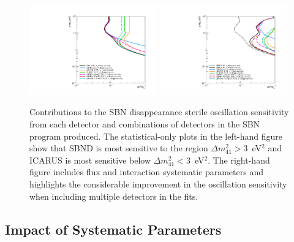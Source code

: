 \begin{figure}[h!]
    \centering
    \includegraphics[width = 0.49\textwidth]{figures-chap6/exclusion_contours/nue_disapp_detector_combinations_stat-only.pdf}
    \includegraphics[width = 0.49\textwidth]{figures-chap6/exclusion_contours/nue_disapp_detector_combinations_stat+syst.pdf}
    \caption[\nue disappearance sensitivities from different detector combinations.]{Contributions to the SBN \nue disappearance sterile oscillation sensitivity from each detector and combinations of detectors in the SBN program produced. The statistical-only plots in the left-hand figure show that SBND is most sensitive to the region $\Delta m_{41}^{2} > 3$~eV$^{2}$ and ICARUS is most sensitive below $\Delta m_{41}^{2} < 3$~eV$^{2}$. The right-hand figure includes flux and interaction systematic parameters and highlights the considerable improvement in the oscillation sensitivity when including multiple detectors in the fits.}
    \label{fig:nue_disapp_sensitivity_detector_contribution}
\end{figure}

\newpage

\subsection{Impact of Systematic Parameters}


